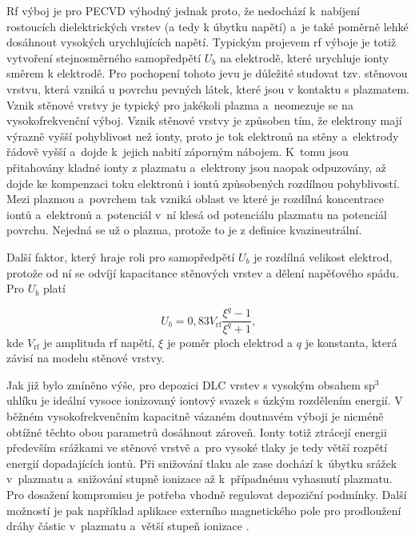 Rf výboj je pro PECVD výhodný jednak proto, že nedochází k~nabíjení rostoucích dielektrických vrstev (a tedy k úbytku napětí) a~je také poměrně lehké dosáhnout vysokých urychlujících napětí. Typickým projevem rf výboje je totiž vytvoření stejnosměrného samopředpětí $U_b$ na elektrodě, které urychluje ionty směrem k elektrodě. Pro pochopení tohoto jevu je důležité studovat tzv. stěnovou vrstvu, která vzniká u povrchu pevných látek, které jsou v kontaktu s plazmatem. Vznik stěnové vrstvy je typický pro jakékoli plazma a~neomezuje se na vysokofrekvenční výboj. Vznik stěnové vrstvy je způsoben tím, že elektrony mají výrazně vyšší pohyblivost než ionty, proto je tok elektronů na stěny a~elektrody řádově vyšší a~dojde k~jejich nabití záporným nábojem. K~tomu jsou přitahovány kladné ionty z plazmatu a~elektrony jsou naopak odpuzovány, až dojde ke kompenzaci toku elektronů i iontů způsobených rozdílnou pohyblivostí. Mezi plazmou a~povrchem tak vzniká oblast ve které je rozdílná koncentrace iontů a~elektronů a~potenciál v~ní klesá od potenciálu plazmatu na potenciál povrchu. Nejedná se už o plazma, protože to je z definice kvazineutrální.

Další faktor, který hraje roli pro samopředpětí $U_b$ je rozdílná velikost elektrod, protože od ní se odvíjí kapacitance stěnových vrstev a dělení napěťového spádu. Pro $U_b$ platí \cite{Zajickova2006}

\begin{equation}
U_b = 0,83 V_\mathrm{rf} \frac{\xi^q - 1}{\xi^q + 1} \text{,}
\end{equation}
kde $V_\mathrm{rf}$ je amplituda rf napětí, $\xi$ je poměr ploch elektrod a $q$ je konstanta, která závisí na modelu stěnové vrstvy.

Jak již bylo zmíněno výše, pro depozici DLC vrstev s vysokým obsahem sp$^3$ uhlíku je ideální vysoce ionizovaný iontový svazek s úzkým rozdělením energií. V běžném vysokofrekvenčním kapacitně vázaném doutnavém výboji je nicméně obtížné těchto obou parametrů dosáhnout zároveň. Ionty totiž ztrácejí energii především srážkami ve stěnové vrstvě a~pro vysoké tlaky je tedy větší rozpětí energií dopadajících iontů. Při snižování tlaku ale zase dochází k~úbytku srážek v~plazmatu a~snižování stupně ionizace až k~případnému vyhasnutí plazmatu. Pro dosažení kompromisu je potřeba vhodně regulovat depoziční podmínky. Další možností je pak například aplikace externího magnetického pole pro prodloužení dráhy částic v~plazmatu a~větší stupeň ionizace \cite{liebermandischarge, chen2003sheet}.



\cleardoublepage
